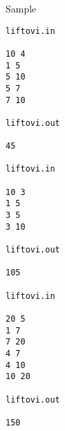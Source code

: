 Sample
\begin{verbatim}
liftovi.in 
 
10 4 
1 5 
5 10 
5 7 
7 10 
 
liftovi.out 
 
45 

liftovi.in 
 
10 3 
1 5 
3 5 
3 10 
 
liftovi.out 
 
105 

liftovi.in 
 
20 5 
1 7 
7 20 
4 7 
4 10 
10 20 
 
liftovi.out 
 
150 

\end{verbatim}